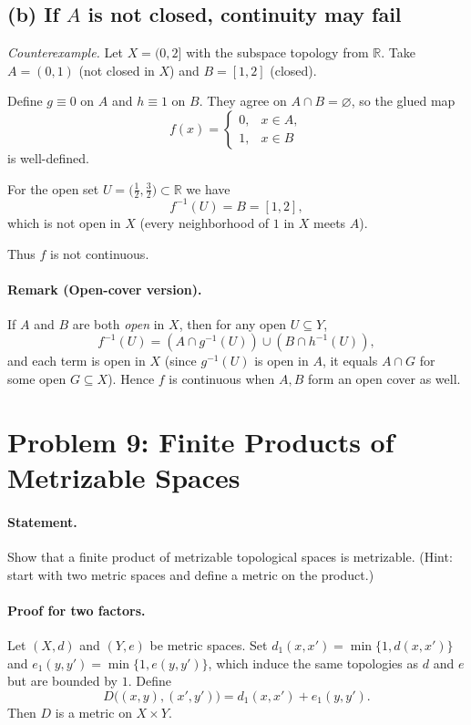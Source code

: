 \documentclass[12pt,a4paper]{article}
\theoremstyle{plain}
\theoremstyle{definition}
\theoremstyle{remark}
\theoremstyle{remark}
\begin{document}
	\subsection*{(b) If $A$ is not closed, continuity may fail}
	
	
\textit{Counterexample.}
Let \(X=(0,2]\) with the subspace topology from \(\mathbb{R}\).
Take \(A=(0,1)\) (not closed in \(X\)) and \(B=[1,2]\) (closed).

Define \(g\equiv 0\) on \(A\) and \(h\equiv 1\) on \(B\).
They agree on \(A\cap B=\varnothing\), so the glued map
\[
f(x)=
\begin{cases}
	0, & x\in A,\\[4pt]
	1, & x\in B
\end{cases}
\]
is well-defined.

For the open set \(U=\bigl(\tfrac12,\tfrac32\bigr)\subset\mathbb{R}\) we have
\[
f^{-1}(U)=B=[1,2],
\]
which is not open in \(X\) (every neighborhood of \(1\) in \(X\) meets \(A\)).

Thus \(f\) is not continuous.
	
	
	
	\paragraph{Remark (Open-cover version).}
	If $A$ and $B$ are both \emph{open} in $X$, then for any open $U\subseteq Y$,
	\[
	f^{-1}(U)=(A\cap g^{-1}(U))\cup(B\cap h^{-1}(U)),
	\]
	and each term is open in $X$ (since $g^{-1}(U)$ is open in $A$, it equals $A\cap G$ for some open $G\subseteq X$).
	Hence $f$ is continuous when $A,B$ form an open cover as well.


\section*{Problem 9: Finite Products of Metrizable Spaces}

\paragraph{Statement.}
Show that a finite product of metrizable topological spaces is metrizable. (Hint: start with two metric spaces and define a metric on the product.)

\paragraph{Proof for two factors.}
Let $(X,d)$ and $(Y,e)$ be metric spaces. Set $\displaystyle d_1(x,x')=\min\{1,d(x,x')\}$ and $\displaystyle e_1(y,y')=\min\{1,e(y,y')\}$, which induce the same topologies as $d$ and $e$ but are bounded by $1$.
Define
\[
D\big((x,y),(x',y')\big)=d_1(x,x')+e_1(y,y').
\]
Then $D$ is a metric on $X\times Y$.
\end{document}
